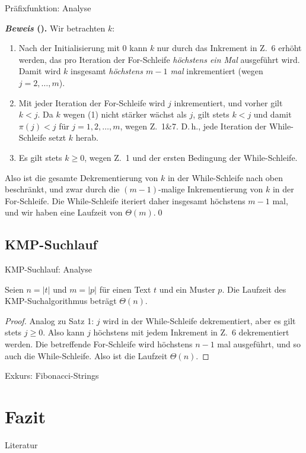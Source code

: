 \documentclass[xcolor=dvipsnames, aspectratio=169]{beamer}
\begin{document}
\begin{frame}{Präfixfunktion: Analyse}
\begin{small}
\textbf{\textit{Beweis} (\cite{cormenalgorithms2009}).}
Wir betrachten $k$: 
\begin{enumerate}[(1)]
\item Nach der Initialisierung mit $0$ kann $k$ nur durch das Inkrement in Z.\ 6 erhöht werden, das pro Iteration der For-Schleife \emph{höchstens ein Mal} ausgeführt wird. Damit wird $k$ insgesamt \emph{höchstens $m-1$ mal} inkrementiert (wegen $j=2,\dots,m$).
\item Mit jeder Iteration der For-Schleife wird $j$ inkrementiert, und vorher gilt $k<j$. Da $k$ wegen (1) nicht stärker wächst als $j$, gilt stets $k<j$ und damit $\pi(j)<j$ für $j=1,2,\dots,m$, wegen Z.\ 1\&7. D.\,h., jede Iteration der While-Schleife setzt $k$ herab.
\item Es gilt stets $k\geq 0$, wegen Z.\ 1 und der ersten Bedingung der While-Schleife.
\end{enumerate}
Also ist die gesamte Dekrementierung von $k$ in der While-Schleife nach oben beschränkt, und zwar durch die $(m-1)$-malige Inkrementierung von $k$ in der For-Schleife. Die While-Schleife iteriert daher insgesamt höchstens $m-1$ mal, und wir haben eine Laufzeit von $\Theta(m)$.\qed
\end{small}
\end{frame}

\subsection{KMP-Suchlauf}


\begin{frame}{KMP-Suchlauf: Analyse}
\begin{theo}
Seien $n=\vert t\vert$ und $m=\vert p\vert$ für einen Text $t$ und ein Muster $p$. Die Laufzeit des KMP-Suchalgorithmus beträgt $\Theta(n)$.
\end{theo}
\begin{proof}
Analog zu Satz 1: $j$ wird in der While-Schleife dekrementiert, aber es gilt stets $j\geq 0$. Also kann $j$ höchstens mit jedem Inkrement in Z.\ 6 dekrementiert werden. Die betreffende For-Schleife wird höchstens $n-1$ mal ausgeführt, und so auch die While-Schleife. Also ist die Laufzeit $\Theta(n)$.
\end{proof}
\end{frame}

\begin{frame}{Exkurs: Fibonacci-Strings}


\end{frame}

\section{Fazit}

\begin{frame}{Literatur}
\nocite{*}
\begin{small}
\printbibliography
\end{small}

\end{frame}

\end{document}

